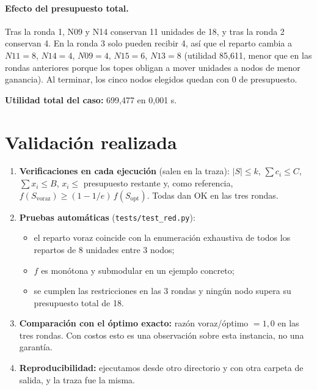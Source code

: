 \documentclass[11pt,a4paper]{article}
\begin{document}
\paragraph{Efecto del presupuesto total.} Tras la ronda 1, N09 y N14 conservan
11 unidades de 18, y tras la ronda 2 conservan 4. En la ronda 3 solo pueden
recibir 4, así que el reparto cambia a $N11=8$, $N14=4$, $N09=4$, $N15=6$,
$N13=8$ (utilidad 85,611, menor que en las rondas anteriores porque los topes
obligan a mover unidades a nodos de menor ganancia). Al terminar, los cinco
nodos elegidos quedan con 0 de presupuesto.

\textbf{Utilidad total del caso:} 699,477 en 0,001 s.

\section{Validación realizada}

\begin{enumerate}[leftmargin=*,label=\arabic*)]
  \item \textbf{Verificaciones en cada ejecución} (salen en la traza):
  $|S|\le k$, $\sum c_i\le C$, $\sum x_i\le B$, $x_i\le$ presupuesto
  restante y, como referencia,
  $f(S_{\text{voraz}})\ge(1-1/e)\,f(S_{\text{opt}})$. Todas dan OK en las tres
  rondas.
  \item \textbf{Pruebas automáticas} (\texttt{tests/test\_red.py}):
  \begin{itemize}[leftmargin=*,label=$\bullet$]
    \item el reparto voraz coincide con la enumeración exhaustiva de todos los
    repartos de 8 unidades entre 3 nodos;
    \item $f$ es monótona y submodular en un ejemplo concreto;
    \item se cumplen las restricciones en las 3 rondas y ningún nodo supera su
    presupuesto total de 18.
  \end{itemize}
  \item \textbf{Comparación con el óptimo exacto:} razón voraz/óptimo
  $=1{,}0$ en las tres rondas. Con costos esto es una observación sobre esta
  instancia, no una garantía.
  \item \textbf{Reproducibilidad:} ejecutamos desde otro directorio y con otra
  carpeta de salida, y la traza fue la misma.
\end{enumerate}
\end{document}

